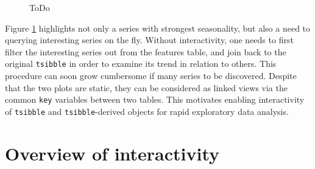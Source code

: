 \begin{Schunk}
\begin{figure}

{\centering {}

}

\caption[ToDo]{ToDo}\label{fig:highlight-retail}
\end{figure}
\end{Schunk}

Figure \ref{fig:highlight-retail} highlights not only a series with
strongest seasonality, but also a need to querying interesting series on
the fly. Without interactivity, one needs to first filter the
interesting series out from the features table, and join back to the
original \texttt{tsibble} in order to examine its trend in relation to
others. This procedure can soon grow cumbersome if many series to be
discovered. Despite that the two plots are static, they can be
considered as linked views via the common \texttt{key} variables between
two tables. This motivates enabling interactivity of \texttt{tsibble}
and \texttt{tsibble}-derived objects for rapid exploratory data
analysis.

\hypertarget{overview-of-interactivity}{%
\section{Overview of interactivity}\label{overview-of-interactivity}}

